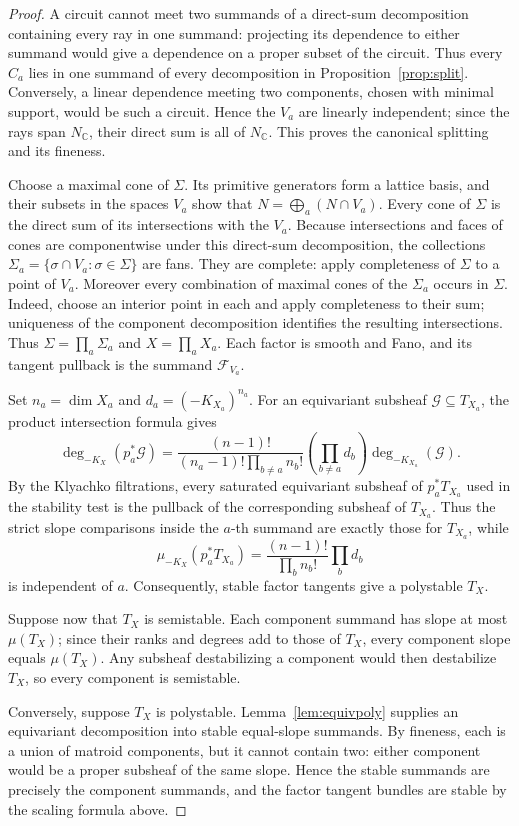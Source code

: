 \documentclass[11pt]{amsart}
\theoremstyle{definition}
\theoremstyle{remark}
\newcommand{\CC}{\mathbb{C}}
\begin{document}
\begin{proof}
A circuit cannot meet two summands of a direct-sum decomposition containing
every ray in one summand: projecting its dependence to either summand would
give a dependence on a proper subset of the circuit. Thus every $C_a$ lies in
one summand of every decomposition in Proposition~\ref{prop:split}.
Conversely, a linear dependence meeting two components, chosen with minimal
support, would be such a circuit. Hence the $V_a$ are linearly independent;
since the rays span $N_\CC$, their direct sum is all of $N_\CC$. This proves
the canonical splitting and its fineness.

Choose a maximal cone of $\Sigma$. Its primitive generators form a lattice
basis, and their subsets in the spaces $V_a$ show that
$N=\bigoplus_a(N\cap V_a)$. Every cone of $\Sigma$ is the direct sum of its
intersections with the $V_a$. Because intersections and faces of cones are
componentwise under this direct-sum decomposition, the collections
$\Sigma_a=\{\sigma\cap V_a:\sigma\in\Sigma\}$ are fans. They are complete:
apply completeness of $\Sigma$ to a point of $V_a$. Moreover every combination
of maximal cones of the $\Sigma_a$ occurs in $\Sigma$. Indeed, choose an
interior point in each and apply completeness to their sum; uniqueness of the
component decomposition identifies the resulting intersections. Thus
$\Sigma=\prod_a\Sigma_a$ and $X=\prod_aX_a$. Each factor is smooth and Fano,
and its tangent pullback is the summand $\mathcal F_{V_a}$.

Set $n_a=\dim X_a$ and $d_a=(-K_{X_a})^{n_a}$. For an equivariant subsheaf
$\mathcal G\subseteq T_{X_a}$, the product intersection formula gives
\[
\deg_{-K_X}(p_a^*\mathcal G)=
\frac{(n-1)!}{(n_a-1)!\prod_{b\ne a}n_b!}
\left(\prod_{b\ne a}d_b\right)\deg_{-K_{X_a}}(\mathcal G).
\]
By the Klyachko filtrations, every saturated equivariant subsheaf of
$p_a^*T_{X_a}$ used in the stability test is the pullback of the corresponding
subsheaf of $T_{X_a}$. Thus the strict slope comparisons inside the $a$-th
summand are exactly those for $T_{X_a}$, while
\[
\mu_{-K_X}(p_a^*T_{X_a})=
\frac{(n-1)!}{\prod_b n_b!}\prod_b d_b
\]
is independent of $a$. Consequently, stable factor tangents give a polystable
$T_X$.

Suppose now that $T_X$ is semistable. Each component summand has slope at
most $\mu(T_X)$; since their ranks and degrees add to those of $T_X$, every
component slope equals $\mu(T_X)$. Any subsheaf destabilizing a component would
then destabilize $T_X$, so every component is semistable.

Conversely, suppose $T_X$ is polystable. Lemma~\ref{lem:equivpoly} supplies an equivariant
decomposition into stable equal-slope summands. By fineness, each is a union
of matroid components, but it cannot contain two: either component would be a
proper subsheaf of the same slope. Hence the stable summands are precisely the
component summands, and the factor tangent bundles are stable by the scaling
formula above.
\end{proof}
\end{document}
